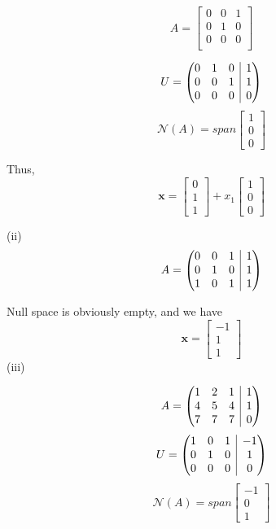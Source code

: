 \documentclass[letterpaper,12pt]{article}
\makeatletter
\theoremstyle{definition}
\newenvironment{amatrix}[1]{%
\left(\begin{array}{@{}*{#1}{c}|c@{}}
}{%
    \end{array}\right)
    }
\makeatother
\begin{document}
\[A =
\begin{bmatrix}
    0 & 0 & 1 \\
    0 & 1 & 0 \\
    0 & 0 & 0 \\
\end{bmatrix}\] 

\[U =
\begin{amatrix}{3}
    0 & 1 & 0 & 1\\
    0 & 0 & 1 & 1\\
    0 & 0 & 0 & 0\\
\end{amatrix}
\]
\[ \mathscr{N} (A) = span 
\begin{bmatrix}
    1 \\
    0\\
    0
\end{bmatrix}
\]

Thus, 
\[
\mathbf{x} = \begin{bmatrix}
    0\\1\\1
\end{bmatrix}
+
x_1
\begin{bmatrix}
    1\\0\\0
\end{bmatrix}
\]

(ii)
\[A =
\begin{amatrix}{3}
    0 & 0 & 1 & 1\\
    0 & 1 & 0 & 1\\
    1 & 0 & 1 & 1\\
\end{amatrix}
\]

Null space is obviously empty, and we have
\[
\mathbf{x} = \begin{bmatrix}
    -1\\1\\1
\end{bmatrix}
\]
(iii)

\[A =
\begin{amatrix}{3}
    1 & 2 & 1 & 1\\
    4 & 5 & 4 & 1\\
    7 & 7 & 7 & 0\\
\end{amatrix}
\]
\[U =
\begin{amatrix}{3}
    1 & 0 & 1 & -1\\
    0 & 1 & 0 & 1\\
    0 & 0 & 0 & 0\\
\end{amatrix}
\]
\[ \mathscr{N} (A) = span 
\begin{bmatrix}
    -1 \\
    0\\
    1
\end{bmatrix}
\]
\end{document}
